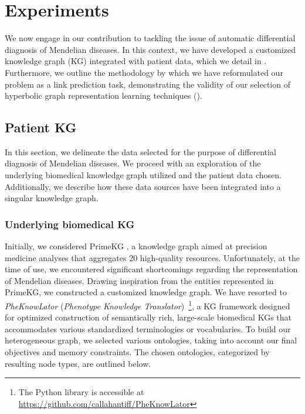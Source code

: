 \chapter{Experiments}
We now engage in our contribution to tackling the issue of automatic differential diagnosis of Mendelian diseases. In this context, we have developed a customized knowledge graph (KG) integrated with patient data, which we detail in . Furthermore, we outline the methodology by which we have reformulated our problem as a link prediction task, demonstrating the validity of our selection of hyperbolic graph representation learning techniques ().

\section{Patient KG}\label{sec:patientKG}
In this section, we delineate the data selected for the purpose of differential diagnosis of Mendelian diseases. We proceed with an exploration of the underlying biomedical knowledge graph utilized and the patient data chosen. Additionally, we describe how these data sources have been integrated into a singular knowledge graph.

\subsection{Underlying biomedical KG}\label{sec:underlyingKG}
Initially, we considered PrimeKG \cite{chandak2023PrimeKG}, a knowledge graph aimed at precision medicine analyses that aggregates 20 high-quality resources. Unfortunately, at the time of use, we encountered significant shortcomings regarding the representation of Mendelian diseases. Drawing inspiration from the entities represented in PrimeKG, we constructed a customized knowledge graph. We have resorted to \emph{PheKnowLator} (\emph{Phenotype Knowledge Translator})~\cite{callahan2020PheKnowlator}\footnote{The Python library is accessible at \url{https://github.com/callahantiff/PheKnowLator}}, a KG framework designed for optimized construction of semantically rich, large-scale biomedical KGs that accommodates various standardized terminologies or vocabularies. To build our heterogeneous graph, we selected various ontologies, taking into account our final objectives and memory constraints. The chosen ontologies, categorized by resulting node types, are outlined below.

